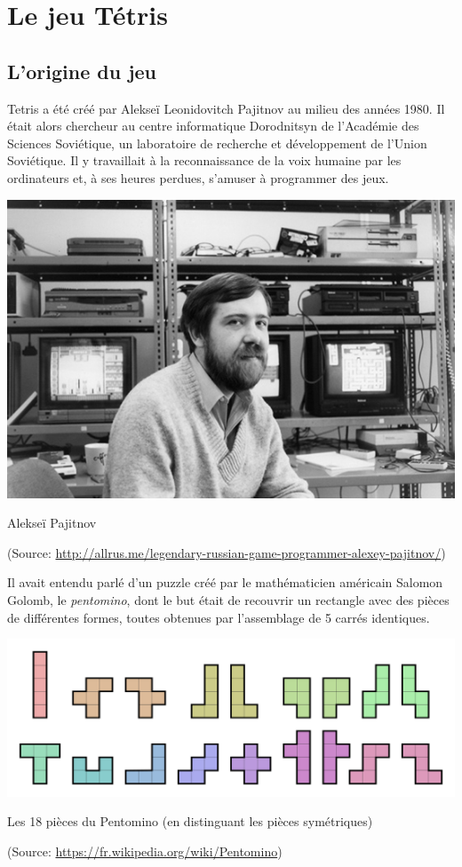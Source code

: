 \chapter{Le jeu Tétris}

\section{L'origine du jeu}

Tetris a été créé par Alekseï Leonidovitch Pajitnov au milieu des années 1980. Il était alors chercheur au centre informatique Dorodnitsyn de l'Académie des Sciences Soviétique, un laboratoire de recherche et développement de l'Union Soviétique. Il y travaillait à la reconnaissance de la voix humaine par les ordinateurs et, à ses heures perdues, s'amuser à programmer des jeux. 

\begin{center}
	\includegraphics[scale=0.45]{../media/Pajitnov.jpg}
	
	Alekseï Pajitnov
	
	(Source: \url{http://allrus.me/legendary-russian-game-programmer-alexey-pajitnov/})
\end{center}

Il avait entendu parlé d'un puzzle créé par le mathématicien américain Salomon Golomb, le \textit{pentomino}, dont le but était de recouvrir un rectangle avec des pièces de différentes formes, toutes obtenues par l'assemblage de 5 carrés identiques.

\begin{center}
	\includegraphics[scale=0.25]{../media/pentomino.png}
	
	Les 18 pièces du Pentomino (en distinguant les pièces symétriques)
	
	(Source: \url{https://fr.wikipedia.org/wiki/Pentomino})
\end{center}



